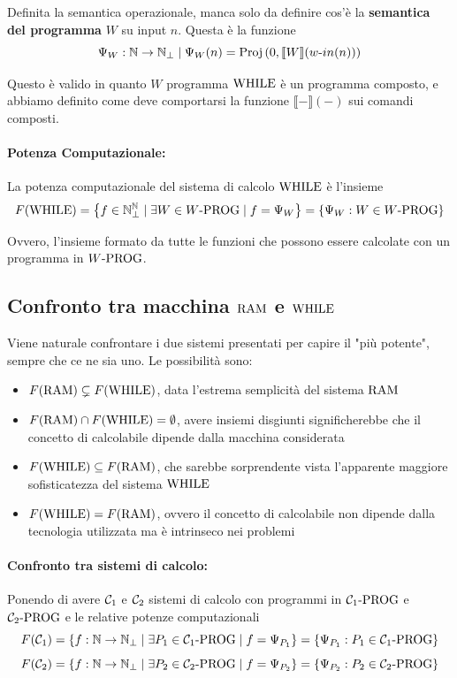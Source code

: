 Definita la semantica operazionale, manca solo da definire cos'è la \textbf{semantica del programma} $W$ su input $n$. Questa è la funzione 
$$ \Psi_W: \mathbb{N} \rightarrow \mathbb{N}_\bot \mid \Psi_W (n) = \text{Proj}\left(0, \llbracket W \rrbracket (w\text{-}in(n))\right)$$

Questo è valido in quanto $W$ programma $\text{WHILE}$ è un programma composto, e abbiamo definito come deve comportarsi la funzione $\llbracket - \rrbracket (-)$ sui comandi composti.\\

\paragraph{Potenza Computazionale:} La potenza computazionale del sistema di calcolo $\text{WHILE}$ è l'insieme 
$$ F(\text{WHILE}) = \left\{f \in \mathbb{N}^{\mathbb{N}}_\bot \mid \exists W \in W\text{-PROG} \mid f = \Psi_W \right\} = \left\{\Psi_W : W \in W\text{-PROG} \right\}$$

Ovvero, l'insieme formato da tutte le funzioni che possono essere calcolate con un programma in $W\text{-PROG}$.\\

\subsection{Confronto tra macchina $\text{RAM}$ e $\text{WHILE}$}
Viene naturale confrontare i due sistemi presentati per capire il "più potente", sempre che ce ne sia uno. Le possibilità sono: 
\begin{itemize}
	\item $F(\text{RAM}) \subsetneq F(\text{WHILE})$, data l'estrema semplicità del sistema $\text{RAM}$
	\item $F(\text{RAM}) \cap F(\text{WHILE}) = \emptyset$, avere insiemi disgiunti significherebbe che il concetto di calcolabile dipende dalla macchina considerata
	\item $F(\text{WHILE}) \subseteq F(\text{RAM})$, che sarebbe sorprendente vista l'apparente maggiore sofisticatezza del sistema $\text{WHILE}$
	\item $F(\text{WHILE}) = F(\text{RAM})$, ovvero il concetto di calcolabile non dipende dalla tecnologia utilizzata ma è intrinseco nei problemi
\end{itemize}

\paragraph{Confronto tra sistemi di calcolo:} Ponendo di avere $\mathcal{C}_1$ e $\mathcal{C}_2$ sistemi di calcolo con programmi in $\mathcal{C}_{1}\text{-}\text{PROG}$ e $\mathcal{C}_{2}\text{-}\text{PROG}$ e le relative potenze computazionali
$$ F(\mathcal{C}_1) = \left\{f: \mathbb{N} \rightarrow \mathbb{N}_\bot \mid \exists P_1 \in \mathcal{C}_{1}\text{-}\text{PROG} \mid f = \Psi_{P_1} \right\} = \left\{\Psi_{P_1}: P_1 \in \mathcal{C}_{1}\text{-}\text{PROG} \right\} $$
$$ F(\mathcal{C}_2) = \left\{f: \mathbb{N} \rightarrow \mathbb{N}_\bot \mid \exists P_2 \in \mathcal{C}_{2}\text{-}\text{PROG} \mid f = \Psi_{P_2} \right\} = \left\{\Psi_{P_2}: P_2 \in \mathcal{C}_{2}\text{-}\text{PROG} \right\} $$

